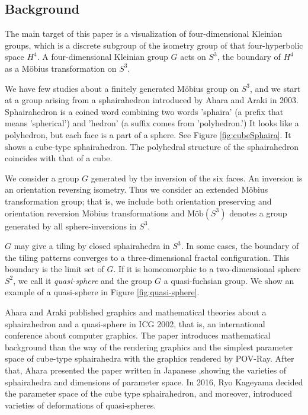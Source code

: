 \documentclass[suppldata, dvipdfmx]{interact}
\theoremstyle{plain}%
\theoremstyle{definition}
\theoremstyle{remark}
\theoremstyle{problemstyle}
\begin{document}
\subsection{Background}

The main target of this paper is a visualization of four-dimensional
Kleinian groups, which is a discrete subgroup of the isometry group of
that four-hyperbolic space $H^4$. A four-dimensional Kleinian group $G$ acts
on $S^3$, the boundary of $H^4$ as a M\"obius transformation on
$S^3$. \par
We have few studies about a finitely generated M\"obius group on $S^3$,
and we start at a group arising from a sphairahedron introduced by Ahara
and Araki in 2003\cite{AharaAraki}.
Sphairahedron is a coined word combining two words 'sphaira' (a prefix
that means 'spherical') and 'hedron' (a suffix comes from 'polyhedron.')
It looks like a polyhedron, but each face is a part of a sphere. See
Figure \ref{fig:cubeSphaira}. It shows a cube-type sphairahedron. The
polyhedral structure of the sphairahedron coincides with that of a cube.

We consider a group $G$ generated by the inversion of the six faces. An
inversion is an orientation reversing isometry. Thus we consider an
extended M\"obius transformation group; that is, we include both
orientation preserving and orientation reversion M\"obius transformations
and $\text{M\"ob}(S^3)$ denotes a group generated by all
sphere-inversions in $S^3$.

$G$ may give a tiling by closed sphairahedra in $S^3$. In some cases, the
boundary of the tiling patterns converges to a three-dimensional fractal
configuration. This boundary is the limit set of $G$. If it is
homeomorphic to a two-dimensional sphere $S^2$, we call it
\textit{quasi-sphere} and the group $G$ a quasi-fuchsian group. We show
an example of a quasi-sphere in Figure \ref{fig:quasi-sphere}.

Ahara and Araki published graphics and mathematical theories about a sphairahedron
and a quasi-sphere in ICG 2002, that is, an international conference about
computer graphics. 
The paper introduces mathematical background than the way of the rendering
graphics and the simplest parameter space of cube-type sphairahedra
with the graphics rendered by POV-Ray.
After that, Ahara presented the paper written in Japanese\cite{AharaJa}
,showing the varieties of sphairahedra and dimensions of parameter space.
In 2016, Ryo Kageyama\cite{kageyama} decided the parameter space of the cube type
sphairahedron, and moreover, introduced varieties of deformations of
quasi-spheres.
\end{document}

